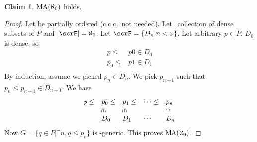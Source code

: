 \documentclass[11pt,pdftex,twoside,a4paper]{article}
\newcommand{\MA}{\ensuremath{\mathop{\rm MA}\nolimits}}
\newcommand{\ccc}{c.c.c.}
\newcommand{\crotin}{\rotatebox[origin=c]{-90}{\(\in\)}}
\theoremstyle{definition}
\newtheorem{claim}[thm]{Claim}
\begin{document}
\begin{claim}
\(\MA(\aleph_0)\) holds.
\end{claim}
\begin{proof}
Let  be partially ordered (\ccc\ not needed).
Let \scrF\ collection of dense subsets of $P$
and \(|\scrF| = \aleph_0\). Let \(\scrF = \{D_n| n < \omega\}\).
Let arbitrary \(p\in P\).  \(D_0\) is dense, so 
\begin{align*}
p \leq & p0 \in D_0 \\
p_0 \leq & p1 \in D_1 \\
\end{align*}
By induction, assume we picked \(p_n \in D_n\).
We pick \(p_{n+1}\) such that \(p_n \leq p_{n+1} \in D_{n+1}\).
We have 
\begin{equation*}
\begin{array}{lllll}
p \leq & p_0 \leq & p_1 \leq &\cdots \leq & p_n \\
       &\crotin   &\crotin   &            & \crotin \\
       & D_0      & D_1      &\cdots      & D_n
\end{array}
\end{equation*}
Now \(G = \{q \in P |\exists n, q \leq p_n\}\) is \scrF-generic.
This proves \(\MA(\aleph_0)\).
\end{proof}
\end{document}
